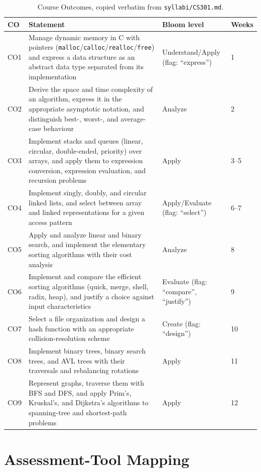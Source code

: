 \documentclass[11pt]{article}
\begin{document}
\begin{table}[h]
\centering
\small
\begin{tabular}{@{}p{0.8cm} p{7.6cm} p{3.6cm} p{1.6cm}@{}}
\toprule
CO & Statement & Bloom level & Weeks \\
\midrule
CO1 & Manage dynamic memory in C with pointers (\texttt{malloc}/\texttt{calloc}/\texttt{realloc}/\texttt{free}) and express a data structure as an abstract data type separated from its implementation & Understand/Apply (flag: ``express'') & 1 \\
CO2 & Derive the space and time complexity of an algorithm, express it in the appropriate asymptotic notation, and distinguish best-, worst-, and average-case behaviour & Analyze & 2 \\
CO3 & Implement stacks and queues (linear, circular, double-ended, priority) over arrays, and apply them to expression conversion, expression evaluation, and recursion problems & Apply & 3--5 \\
CO4 & Implement singly, doubly, and circular linked lists, and select between array and linked representations for a given access pattern & Apply/Evaluate (flag: ``select'') & 6--7 \\
CO5 & Apply and analyze linear and binary search, and implement the elementary sorting algorithms with their cost analysis & Analyze & 8 \\
CO6 & Implement and compare the efficient sorting algorithms (quick, merge, shell, radix, heap), and justify a choice against input characteristics & Evaluate (flag: ``compare'', ``justify'') & 9 \\
CO7 & Select a file organization and design a hash function with an appropriate collision-resolution scheme & Create (flag: ``design'') & 10 \\
CO8 & Implement binary trees, binary search trees, and AVL trees with their traversals and rebalancing rotations & Apply & 11 \\
CO9 & Represent graphs, traverse them with BFS and DFS, and apply Prim's, Kruskal's, and Dijkstra's algorithms to spanning-tree and shortest-path problems & Apply & 12 \\
\bottomrule
\end{tabular}
\caption{Course Outcomes, copied verbatim from \texttt{syllabi/CS301.md}.}
\label{tab:co}
\end{table}

\section{Assessment-Tool Mapping}
\end{document}
